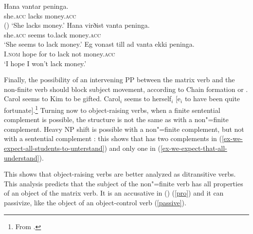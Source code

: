 \eal
\ex 
\gll Hana             vantar peninga.\\
     she.\textsc{acc} lacks  money.\textsc{acc} \\\hfill()
\glt `She lacks money.'
\ex 
\gll Hana             virðist vanta   peninga.\footnotemark \label{need} \\
     she.\textsc{acc} seems   to.lack money.\textsc{acc} \\
\glt `She seems to lack money.'
\ex 
\gll Eg             vonast till ad vanta ekki peninga. \label{hope-i} \\
     I.\textsc{nom} hope   for  to lack  not  money.\textsc{acc} \\
\glt `I hope I won't lack money.'
\zl

Finally, the possibility of an intervening PP between the matrix verb and the non-finite verb should
block subject movement, according to Chain formation or 
\citep{Rizzi1986,Rizzi1990b-u}.
\eal
\ex Carol seems to Kim to be gifted.
\ex Carol$_i$ seems to herself$_i$ [e$_i$ to have been quite fortunate].\footnote{
From \citet[]{McGinnis2004a-u}.
}
\zl
Turning now to object-raising verbs, when a finite sentential complement is possible, the structure
is not the same as  with a non"=finite complement. Heavy NP shift is possible with a non"=finite
complement, but not with a sentential complement \parencites[]{Bresnan1982}[]{PollardandSag1994}: this shows that  has two complements in (\ref{ex-we-expect-all-students-to-unterstand}) and only one in (\ref{ex-we-expect-that-all-understand}).

\eal
{}
\zl



\noindent
This shows that object-raising verbs are better analyzed as ditransitive verbs. This analysis predicts that the subject of the non"=finite verb has all properties of an object of the matrix verb. It is an accusative in  () (\ref{pro}) and it can passivize, like the object of an object-control verb (\ref{passive}).

